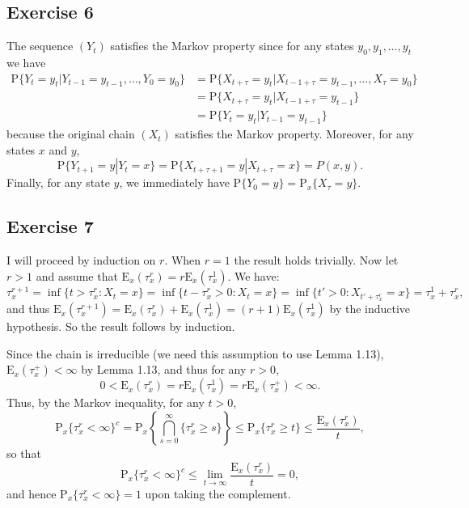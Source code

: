 \documentclass[12pt]{article}
\newcommand{\E}{\mathrm{E}}
\newcommand{\Prob}{\mathrm{P}}
\begin{document}
\subsection*{Exercise 6}

The sequence $(Y_t)$ satisfies the Markov property since for any states $y_0, y_1, \ldots, y_t$ we have
\begin{align*}
\Prob \{Y_t = y_t | Y_{t-1} = y_{t-1}, \ldots, Y_0 = y_0\} &= \Prob \{X_{t + \tau} = y_t | X_{t-1+\tau} = y_{t-1}, \ldots, X_\tau = y_0\} \\
&= \Prob \{X_{t + \tau} = y_t | X_{t-1+\tau} = y_{t-1}\} \\
&= \Prob \{Y_t = y_t | Y_{t-1} = y_{t-1}\}
\end{align*}
because the original chain $(X_t)$ satisfies the Markov property. Moreover, for any states $x$ and $y$,
\begin{equation*}
\Prob \{Y_{t+1} = y | Y_t = x\} = \Prob\{X_{t+\tau+1} = y | X_{t+\tau} = x\} = P(x, y).
\end{equation*}
Finally, for any state $y$, we immediately have $\Prob\{Y_0 = y\} = \Prob_x\{X_\tau = y\}$.

\subsection*{Exercise 7}

I will proceed by induction on $r$. When $r = 1$ the result holds trivially. Now let $r > 1$ and assume that $\E_x(\tau_x^r) = r\E_x(\tau_x^1)$. We have:
\begin{equation*}
\tau_x^{r+1} = \inf\{t > \tau_x^r : X_t = x\} = \inf\{t - \tau_x^r > 0 : X_t = x\} = \inf\{t' > 0 : X_{t' + \tau_x^r} = x\} = \tau_x^1 + \tau_x^r,
\end{equation*}
and thus $\E_x(\tau_x^{r+1}) = \E_x(\tau_x^r) + \E_x(\tau_x^1) = (r+1) \E_x(\tau_x^1)$ by the inductive hypothesis. So the result follows by induction.

Since the chain is irreducible (we need this assumption to use Lemma 1.13), $\E_x(\tau_x^+) < \infty$ by Lemma 1.13, and thus for any $r > 0$,
\begin{equation*}
0 < \E_x(\tau^r_x) = r\E_x(\tau^1_x) = r\E_x(\tau^+_x) < \infty.
\end{equation*}
Thus, by the Markov inequality, for any $t > 0$,
\begin{equation*}
\Prob_x\{\tau_x^r < \infty\}^c = \Prob_x\left\{\bigcap_{s=0}^\infty \{\tau_x^r \geq s \} \right\} \leq \Prob_x\{\tau_x^r \geq t\} \leq \frac{\E_x(\tau_x^r)}{t},
\end{equation*}
so that
\begin{equation*}
\Prob_x\{\tau_x^r < \infty\}^c \leq \lim_{t \to \infty} \frac{\E_x(\tau_x^r)}{t} = 0,
\end{equation*}
and hence $\Prob_x\{\tau_x^r < \infty\} = 1$ upon taking the complement.
\end{document}
